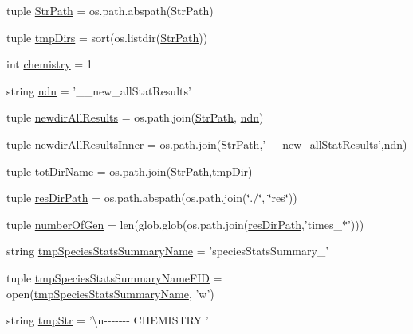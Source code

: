 \begin{DoxyCompactItemize}
\item 
tuple \hyperlink{a00097_a05f0f829ce4df27678aa19d4e5f10c54}{Str\-Path} = os.\-path.\-abspath(Str\-Path)
\item 
tuple \hyperlink{a00097_addf4c61c6afe70a2ea39931695ddc36b}{tmp\-Dirs} = sort(os.\-listdir(\hyperlink{a00097_a05f0f829ce4df27678aa19d4e5f10c54}{Str\-Path}))
\item 
int \hyperlink{a00097_a5459c566e6ccdf02747a3c16089a5593}{chemistry} = 1
\item 
string \hyperlink{a00097_ad2a87ed28d0f42525ce49c390f390298}{ndn} = '\-\_\-\_\-new\-\_\-all\-Stat\-Results'
\item 
tuple \hyperlink{a00097_a4fc28291b7f61ee2fa8969fa7a690ba2}{newdir\-All\-Results} = os.\-path.\-join(\hyperlink{a00097_a05f0f829ce4df27678aa19d4e5f10c54}{Str\-Path}, \hyperlink{a00097_ad2a87ed28d0f42525ce49c390f390298}{ndn})
\item 
tuple \hyperlink{a00097_ae77a5ce35739a29f29f9df698d91f1c9}{newdir\-All\-Results\-Inner} = os.\-path.\-join(\hyperlink{a00097_a05f0f829ce4df27678aa19d4e5f10c54}{Str\-Path},'\-\_\-\_\-new\-\_\-all\-Stat\-Results',\hyperlink{a00097_ad2a87ed28d0f42525ce49c390f390298}{ndn})
\item 
tuple \hyperlink{a00097_aa71c948cf1d0699207eafcd30beb394e}{tot\-Dir\-Name} = os.\-path.\-join(\hyperlink{a00097_a05f0f829ce4df27678aa19d4e5f10c54}{Str\-Path},tmp\-Dir)
\item 
tuple \hyperlink{a00097_a2c1728d3ec9815ec7cf41653e953524c}{res\-Dir\-Path} = os.\-path.\-abspath(os.\-path.\-join(\char`\"{}./\char`\"{}, \char`\"{}res\char`\"{}))
\item 
tuple \hyperlink{a00097_acceae37ca98ccf6dc25c9f538fda386f}{number\-Of\-Gen} = len(glob.\-glob(os.\-path.\-join(\hyperlink{a00097_a2c1728d3ec9815ec7cf41653e953524c}{res\-Dir\-Path},'times\-\_\-$\ast$')))
\item 
string \hyperlink{a00097_aceab16acbf85893dcacfcfd921c9da12}{tmp\-Species\-Stats\-Summary\-Name} = 'species\-Stats\-Summary\-\_\-'
\item 
tuple \hyperlink{a00097_a57b362cf15dda461a59c719a92177c3a}{tmp\-Species\-Stats\-Summary\-Name\-F\-I\-D} = open(\hyperlink{a00097_aceab16acbf85893dcacfcfd921c9da12}{tmp\-Species\-Stats\-Summary\-Name}, 'w')
\item 
string \hyperlink{a00097_a81ab8133517c53adfcdf8129e24cf5d0}{tmp\-Str} = '\textbackslash{}n-\/-\/-\/-\/-\/-\/-\/ C\-H\-E\-M\-I\-S\-T\-R\-Y '
\item 

\end{DoxyCompactItemize}
